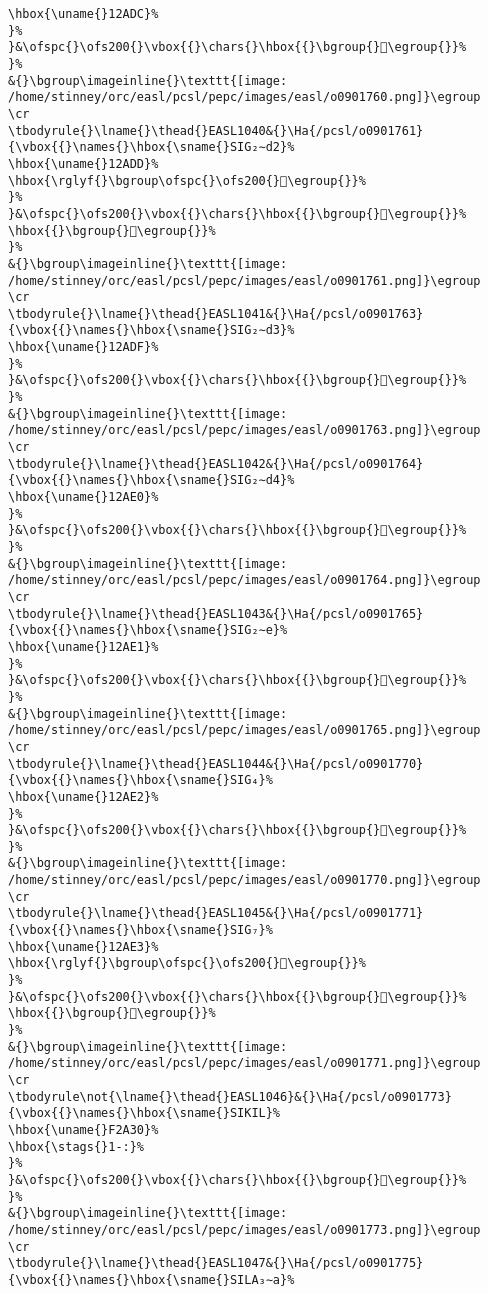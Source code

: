 \begin{verbatim}
\hbox{\uname{}12ADC}%
}%
}&\ofspc{}\ofs200{}\vbox{{}\chars{}\hbox{{}\bgroup{}𒫜\egroup{}}%
}%
&{}\bgroup\imageinline{}\texttt{[image: /home/stinney/orc/easl/pcsl/pepc/images/easl/o0901760.png]}\egroup
\cr
\tbodyrule{}\lname{}\thead{}EASL1040&{}\Ha{/pcsl/o0901761}{\vbox{{}\names{}\hbox{\sname{}SIG₂∼d2}%
\hbox{\uname{}12ADD}%
\hbox{\rglyf{}\bgroup\ofspc{}\ofs200{}𒫝\egroup{}}%
}%
}&\ofspc{}\ofs200{}\vbox{{}\chars{}\hbox{{}\bgroup{}𒫝\egroup{}}%
\hbox{{}\bgroup{}𒫞\egroup{}}%
}%
&{}\bgroup\imageinline{}\texttt{[image: /home/stinney/orc/easl/pcsl/pepc/images/easl/o0901761.png]}\egroup
\cr
\tbodyrule{}\lname{}\thead{}EASL1041&{}\Ha{/pcsl/o0901763}{\vbox{{}\names{}\hbox{\sname{}SIG₂∼d3}%
\hbox{\uname{}12ADF}%
}%
}&\ofspc{}\ofs200{}\vbox{{}\chars{}\hbox{{}\bgroup{}𒫟\egroup{}}%
}%
&{}\bgroup\imageinline{}\texttt{[image: /home/stinney/orc/easl/pcsl/pepc/images/easl/o0901763.png]}\egroup
\cr
\tbodyrule{}\lname{}\thead{}EASL1042&{}\Ha{/pcsl/o0901764}{\vbox{{}\names{}\hbox{\sname{}SIG₂∼d4}%
\hbox{\uname{}12AE0}%
}%
}&\ofspc{}\ofs200{}\vbox{{}\chars{}\hbox{{}\bgroup{}𒫠\egroup{}}%
}%
&{}\bgroup\imageinline{}\texttt{[image: /home/stinney/orc/easl/pcsl/pepc/images/easl/o0901764.png]}\egroup
\cr
\tbodyrule{}\lname{}\thead{}EASL1043&{}\Ha{/pcsl/o0901765}{\vbox{{}\names{}\hbox{\sname{}SIG₂∼e}%
\hbox{\uname{}12AE1}%
}%
}&\ofspc{}\ofs200{}\vbox{{}\chars{}\hbox{{}\bgroup{}𒫡\egroup{}}%
}%
&{}\bgroup\imageinline{}\texttt{[image: /home/stinney/orc/easl/pcsl/pepc/images/easl/o0901765.png]}\egroup
\cr
\tbodyrule{}\lname{}\thead{}EASL1044&{}\Ha{/pcsl/o0901770}{\vbox{{}\names{}\hbox{\sname{}SIG₄}%
\hbox{\uname{}12AE2}%
}%
}&\ofspc{}\ofs200{}\vbox{{}\chars{}\hbox{{}\bgroup{}𒫢\egroup{}}%
}%
&{}\bgroup\imageinline{}\texttt{[image: /home/stinney/orc/easl/pcsl/pepc/images/easl/o0901770.png]}\egroup
\cr
\tbodyrule{}\lname{}\thead{}EASL1045&{}\Ha{/pcsl/o0901771}{\vbox{{}\names{}\hbox{\sname{}SIG₇}%
\hbox{\uname{}12AE3}%
\hbox{\rglyf{}\bgroup\ofspc{}\ofs200{}𒫣\egroup{}}%
}%
}&\ofspc{}\ofs200{}\vbox{{}\chars{}\hbox{{}\bgroup{}𒫣\egroup{}}%
\hbox{{}\bgroup{}𒫤\egroup{}}%
}%
&{}\bgroup\imageinline{}\texttt{[image: /home/stinney/orc/easl/pcsl/pepc/images/easl/o0901771.png]}\egroup
\cr
\tbodyrule\not{\lname{}\thead{}EASL1046}&{}\Ha{/pcsl/o0901773}{\vbox{{}\names{}\hbox{\sname{}SIKIL}%
\hbox{\uname{}F2A30}%
\hbox{\stags{}1-:}%
}%
}&\ofspc{}\ofs200{}\vbox{{}\chars{}\hbox{{}\bgroup{}󲨰\egroup{}}%
}%
&{}\bgroup\imageinline{}\texttt{[image: /home/stinney/orc/easl/pcsl/pepc/images/easl/o0901773.png]}\egroup
\cr
\tbodyrule{}\lname{}\thead{}EASL1047&{}\Ha{/pcsl/o0901775}{\vbox{{}\names{}\hbox{\sname{}SILA₃∼a}%

\end{verbatim}
